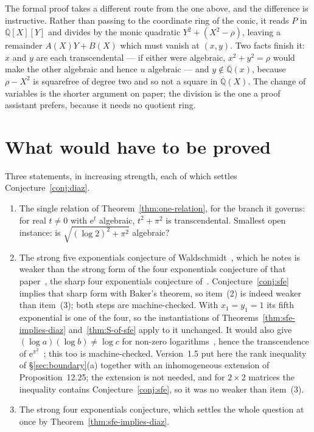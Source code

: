 \documentclass[11pt,a4paper]{article}
\theoremstyle{plain}
\theoremstyle{definition}
\newcommand{\e}{\mathrm{e}}
\newcommand{\Alg}{\overline{\mathbb{Q}}}
\begin{document}
The formal proof takes a different route from the one above, and the difference is instructive.
Rather than passing to the coordinate ring of the conic, it reads $P$ in $\Alg[X][Y]$ and divides
by the monic quadratic $Y^{2}+(X^{2}-\rho)$, leaving a remainder $A(X)Y+B(X)$ which must vanish at
$(x,y)$. Two facts finish it: $x$ and $y$ are each transcendental --- if either were algebraic,
$x^{2}+y^{2}=\rho$ would make the other algebraic and hence $u$ algebraic --- and $y\notin\Alg(x)$,
because $\rho-X^{2}$ is squarefree of degree two and so not a square in $\Alg(X)$. The change of
variables is the shorter argument on paper; the division is the one a proof assistant prefers,
because it needs no quotient ring.

\section{What would have to be proved}\label{sec:what}

Three statements, in increasing strength, each of which settles Conjecture~\ref{conj:diaz}.

\begin{enumerate}[label=\textup{(\arabic*)}]
  \item The single relation of Theorem~\ref{thm:one-relation}, for the branch it governs: for
        real $t\neq0$ with $\e^{t}$ algebraic, $t^{2}+\pi^{2}$ is transcendental. Smallest open
        instance: is $\sqrt{(\log2)^{2}+\pi^{2}}$ algebraic?
  \item The strong five exponentials conjecture of Waldschmidt~\cite[p.~379]{waldschmidt-1988},
        which he notes is weaker than the strong form of the four exponentials conjecture of that
        paper~\cite[p.~377]{waldschmidt-1988}, the sharp four exponentials conjecture
        of~\cite{waldschmidt-hopf}. Conjecture~\ref{conj:sfe} implies that sharp form with
        Baker's theorem, so item~(2) is indeed weaker than item~(3); both steps are
        machine-checked. With
        $x_{1}=y_{1}=1$ its fifth exponential is one of the four, so the instantiations of
        Theorems~\ref{thm:sfe-implies-diaz} and~\ref{thm:S-of-sfe} apply to it unchanged. It would
        also give $(\log a)(\log b)\neq\log c$ for non-zero logarithms~\cite[p.~379]{waldschmidt-1988},
        hence the transcendence of $\e^{\pi^{2}}$~\cite{waldschmidt-hopf}; this too is
        machine-checked. Version~1.5
        put here the rank inequality of \S\ref{sec:boundary}(a) together with an inhomogeneous
        extension of Proposition~12.25; the extension is not needed, and for $2\times2$ matrices the
        inequality contains Conjecture~\ref{conj:sfe}, so it was no weaker than item~(3).
  \item The strong four exponentials conjecture, which settles the whole question at once by
        Theorem~\ref{thm:sfe-implies-diaz}.
\end{enumerate}
\end{document}
